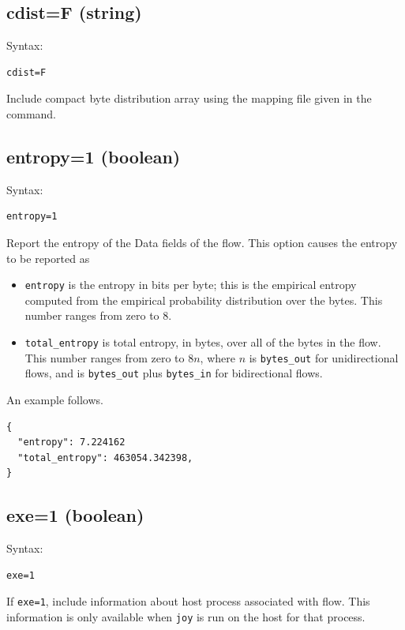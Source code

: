 \documentclass{book}
\begin{document}
\subsection{cdist=F (string)}
\label{cdist}
\begin{mdframed}[style=aaa]
Syntax:
  \begin{verbatim}
cdist=F                    
  \end{verbatim}
\end{mdframed}
Include compact byte distribution array using the mapping file  given in
the command.

\subsection{entropy=1 (boolean)}
\label{entropy}
\begin{mdframed}[style=aaa]
Syntax:
  \begin{verbatim}
entropy=1                  
  \end{verbatim}
\end{mdframed}
Report the entropy of the Data fields of the flow.
This option causes the entropy to be reported as
\begin{itemize}
\item \texttt{entropy} is the entropy in bits per byte; this is the empirical entropy
  computed from the empirical probability distribution over the bytes.  This
  number ranges from zero to 8.
\item \texttt{total\_entropy} is total entropy, in bytes, over all of
  the bytes in the flow.  This number ranges from zero to $8n$, where
  $n$ is \texttt{bytes\_out} for unidirectional flows, and is
  \texttt{bytes\_out} plus \texttt{bytes\_in} for bidirectional
  flows.
\end{itemize}
An example follows.
\begin{mdframed}[style=cli]
  \begin{verbatim}
{
  "entropy": 7.224162
  "total_entropy": 463054.342398,
}
  \end{verbatim}
\end{mdframed}



\subsection{exe=1 (boolean)}
\label{exe}
\begin{mdframed}[style=aaa]
Syntax:
  \begin{verbatim}
exe=1                      
  \end{verbatim}
\end{mdframed}
If \texttt{exe=1}, include information about host process associated
with flow.  This information is only available when \texttt{joy} is
run on the host for that process.  
\end{document}
